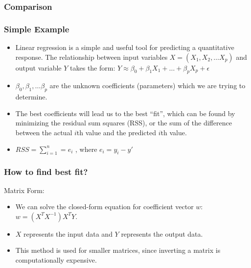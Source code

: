 \begin{frame}[fragile] \frametitle{Comparison}

\hfill
{}
\end{frame}

\begin{frame}[fragile]\frametitle{Simple Example}
\begin{itemize}
\item Linear regression is a simple and useful tool for predicting
a quantitative response. The relationship between input
variables $X = (X_1 , X_2 , \ldots X_p )$ and output variable $Y$ takes
the form: $Y \approx \beta_0 + \beta_1 X_1 + \ldots + \beta_p X_p + \epsilon$
\item $\beta_0 , \beta_1 ,\ldots \beta_p$ are the unknown coefficients (parameters) which
we are trying to determine. 
\item The best coefficients will lead us to the best ``fit'', which can be found by
minimizing the residual sum squares (RSS), or the sum of the difference between the actual $i$th value and
the predicted $i$th value. 
\item $RSS = \sum_{i=1}^n = e_i$ , where $e_i = y_i - y'$
\end{itemize}
\end{frame}

\begin{frame}[fragile]\frametitle{How to find best fit?}
Matrix Form:
\begin{itemize}
\item  We can solve the closed-form equation for coefficient vector $w$: $w = (X^T X^{-1}) X^T Y$. 
\item $X$ represents the input data and $Y$ represents the output data. 
\item This method is used for smaller matrices, since inverting a matrix is computationally expensive.
\end{itemize}
\end{frame}

